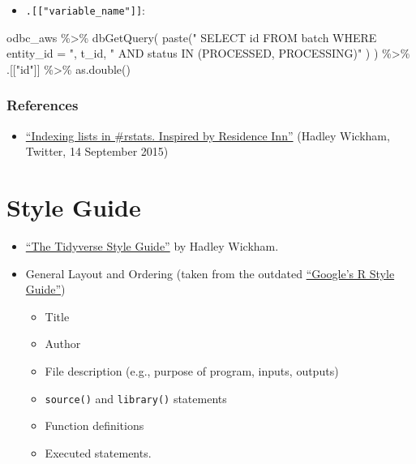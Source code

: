 \documentclass[
]{book}
\newenvironment{Shaded}{\begin{snugshade}}{\end{snugshade}}
\newcommand{\FunctionTok}[1]{\textcolor[rgb]{0.00,0.00,0.00}{#1}}
\newcommand{\NormalTok}[1]{#1}
\newcommand{\SpecialCharTok}[1]{\textcolor[rgb]{0.00,0.00,0.00}{#1}}
\newcommand{\StringTok}[1]{\textcolor[rgb]{0.31,0.60,0.02}{#1}}
\providecommand{\tightlist}{%
  \setlength{\itemsep}{0pt}\setlength{\parskip}{0pt}}
\begin{document}
\begin{itemize}
\tightlist
\item
  \texttt{.{[}{[}"variable\_name"{]}{]}}:
\end{itemize}

\begin{Shaded}
\begin{Highlighting}[]
\NormalTok{odbc\_aws }\SpecialCharTok{\%\textgreater{}\%} 
  \FunctionTok{dbGetQuery}\NormalTok{(}
    \FunctionTok{paste}\NormalTok{(}\StringTok{"}
\StringTok{          SELECT id}
\StringTok{          FROM batch}
\StringTok{          WHERE entity\_id = "}\NormalTok{, t\_id, }\StringTok{"}
\StringTok{          AND status IN (\textquotesingle{}PROCESSED\textquotesingle{}, \textquotesingle{}PROCESSING\textquotesingle{})"}
\NormalTok{    )}
\NormalTok{  ) }\SpecialCharTok{\%\textgreater{}\%} 
\NormalTok{  .[[}\StringTok{"id"}\NormalTok{]] }\SpecialCharTok{\%\textgreater{}\%} 
\FunctionTok{as.double}\NormalTok{()}
\end{Highlighting}
\end{Shaded}

\hypertarget{references-1}{%
\subsubsection{References}\label{references-1}}

\begin{itemize}
\tightlist
\item
  \href{https://twitter.com/hadleywickham/status/643381054758363136}{``Indexing lists in \#rstats. Inspired by Residence Inn''} (Hadley Wickham, Twitter, 14 September 2015)
\end{itemize}

\hypertarget{style-guide}{%
\section{Style Guide}\label{style-guide}}

\begin{itemize}
\tightlist
\item
  \href{https://style.tidyverse.org/}{``The Tidyverse Style Guide''} by Hadley Wickham.
\item
  General Layout and Ordering (taken from the outdated \href{http://web.stanford.edu/class/cs109l/unrestricted/resources/google-style.html}{``Google's R Style Guide''})

  \begin{itemize}
  \tightlist
  \item
    Title
  \item
    Author
  \item
    File description (e.g., purpose of program, inputs, outputs)
  \item
    \texttt{source()} and \texttt{library()} statements
  \item
    Function definitions
  \item
    Executed statements.
  \end{itemize}
\end{itemize}
\end{document}
